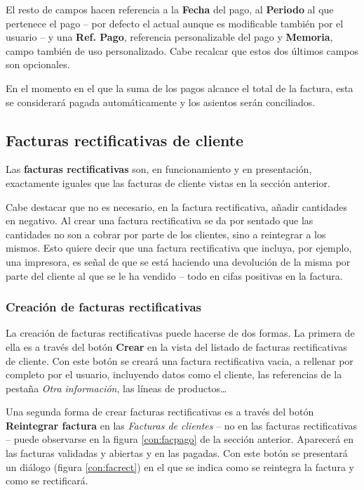El resto de campos hacen referencia a la \textbf{Fecha} del pago, al \textbf{Periodo} al que pertenece el pago -- por defecto el actual aunque es modificable también por el usuario -- y una \textbf{Ref. Pago}, referencia personalizable del pago  y \textbf{Memoria}, campo también de uso personalizado. Cabe recalcar que estos dos últimos campos son opcionales.

En el momento en el que la suma de los pagos alcance el total de la factura, esta se considerará pagada automáticamente y los asientos serán conciliados.




\subsection{Facturas rectificativas de cliente}

Las \textbf{facturas rectificativas} son, en funcionamiento y en presentación, exactamente iguales que las facturas de cliente vistas en la sección anterior.

Cabe destacar que no es necesario, en la factura rectificativa, añadir cantidades en negativo. Al crear una factura rectificativa se da por sentado que las cantidades no son a cobrar por parte de los clientes, sino a reintegrar a los mismos. Esto quiere decir que una factura rectificativa que incluya, por ejemplo, una impresora, es señal de que se está haciendo una devolución de la misma por parte del cliente al que se le ha vendido -- todo en cifas positivas en la factura.

\subsubsection{Creación de facturas rectificativas}

La creación de facturas rectificativas puede hacerse de dos formas. La primera de ella es a través del botón \textbf{Crear} en la vista del listado de facturas rectificativas de cliente. Con este botón se creará una factura rectificativa vacia, a rellenar por completo por el usuario, incluyendo datos como el cliente, las referencias de la pestaña \emph{Otra información}, las líneas de productos\ldots

Una segunda forma de crear facturas rectificativas es a través del botón \textbf{Reintegrar factura} en las \emph{Facturas de clientes} -- no en las facturas rectificativas -- puede observarse en la figura \ref{con:facpago} de la sección anterior. Aparecerá en las facturas validadas y abiertas y en las pagadas. Con este botón se presentará un diálogo (figura \ref{con:facrect}) en el que se indica como se reintegra la factura y como se rectificará.

